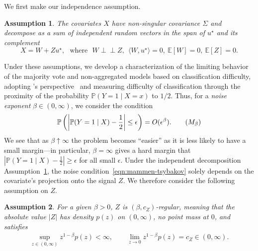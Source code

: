 \documentclass[11pt]{article}
\newcommand{\Ep}{\mathbb{E}}
\newcommand{\Prb}{\mathbb{P}}
\renewcommand{\P}{\mathbb{P}}
\newcommand{\<}{\langle} %
\renewcommand{\>}{\rangle}
\newcommand{\half}{\frac{1}{2}}
\newcommand{\opt}{^\star}
\newtheorem{assumption}{Assumption}
\begin{document}
We first make our independence assumption.
\begin{assumption}
  \label{assumption:x-decomposition}
  The covariates $X$ have non-singular covariance $\Sigma$ and decompose as a
  sum of independent random vectors in the span of $u\opt$ and its
  complement
  \begin{equation*}
    X = W +  Z u^\star  ,
    ~~~\mbox{where}~~~
    W \perp\!\!\!\!\perp Z  , ~~
    \<W,u\opt\> = 0  ,
    ~ \Ep[W] = 0  ,
    ~ \Ep[Z] = 0  .
  \end{equation*}
\end{assumption}
Under these assumptions, we develop a characterization of the limiting
behavior of the majority vote and non-aggregated models based on
classification difficulty, adopting \citeauthor{MammenTs99}'s
perspective~\citep{MammenTs99}
and measuring difficulty of classification through the proximity of the
probability $\Prb(Y = 1 \mid X = x)$ to $1/2$.
Thus, for a \emph{noise exponent} $\beta \in (0, \infty)$, we
consider the condition
\begin{equation}
  \label{eqn:mammen-tsybakov}
  \Prb \left( \left|\Prb(Y = 1 \mid X) - \frac 1 2 \right| \leq \epsilon \right)
  = O(\epsilon^\beta)  .
  \tag{$\textsc{M}_\beta$}
\end{equation}
We see that as $\beta \uparrow \infty$ the problem becomes ``easier'' as it
is less likely to have a small margin---in particular, $\beta=\infty$ gives
a hard margin that $|\P(Y = 1 \mid X) - \half| \ge \epsilon$ for all small
$\epsilon$. Under the independent decomposition
Assumption~\ref{assumption:x-decomposition}, the noise
condition~\eqref{eqn:mammen-tsybakov} solely depends on the covariate's
projection onto the signal $Z$. We therefore consider the
following assumption on $Z$.
\begin{assumption}
  \label{assumption:z-density}
  For a given $\beta > 0$, $Z$ is \emph{$(\beta, c_Z)$-regular}, meaning
  that the absolute value $|Z|$ has density $p(z)$ on $(0, \infty)$, no
  point mass at $0$, and satisfies
  \begin{align*}
    \sup_{z \in (0, \infty)} z^{1 - \beta} p(z) < \infty,
    \qquad \lim_{z \to 0}z^{1 - \beta} p(z) = c_Z \in (0, \infty).
  \end{align*}
\end{assumption}
\end{document}
